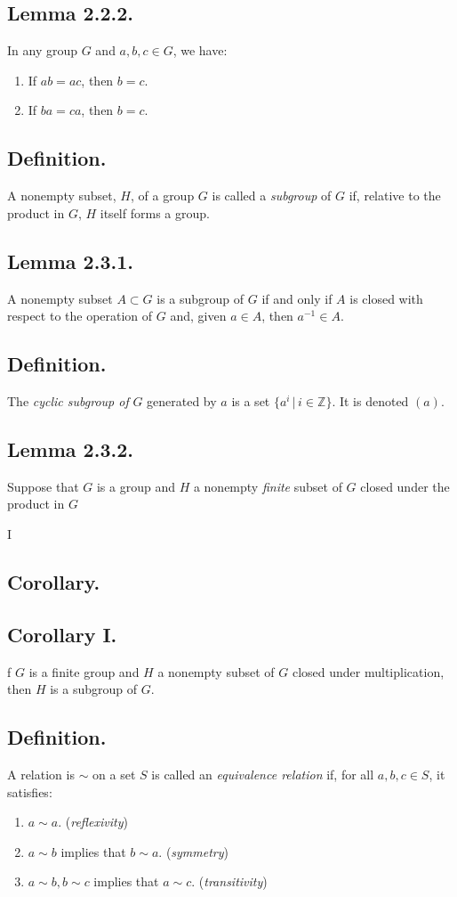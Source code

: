\documentclass{article}
\newenvironment{lemma}[1]{\subsection*{Lemma #1.}}{}
\newenvironment{defn}{\subsection*{Definition.}}{}
\newenvironment{corollary}[1]{
    \def\temp{#1}\ifx\temp\empty
        \subsection*{Corollary.}
    \else
        \subsection*{Corollary #1.}
    \fi
    
}{}
\newcommand*{\Z}{\mathbb{Z}}
\begin{document}
\begin{lemma}{2.2.2}
    In any group $G$ and $a, b, c \in G$, we have:
    \begin{enumerate}[label=(\alph*)]
        \item If $ab = ac$, then $b = c$.
        \item If $ba = ca$, then $b = c$.
    \end{enumerate}
\end{lemma}

\begin{defn}
    A nonempty subset, $H$, of a group $G$ is called a \textit{subgroup} of $G$ if,
    relative to the product in $G$, $H$ itself forms a group.
\end{defn}

\begin{lemma}{2.3.1}
    A nonempty subset $A \subset G$ is a subgroup of $G$ if and only if $A$ is closed 
    with respect to the operation of $G$ and, given $a \in A$, then $a^{-1} \in A$.
\end{lemma}

\begin{defn}
    The \textit{cyclic subgroup of} $G$ generated by $a$ is a set $\{a^i \, | \, i \in \Z\}$.
    It is denoted $(a)$.
\end{defn}

\begin{lemma}{2.3.2}
    Suppose that $G$ is a group and $H$ a nonempty \textit{finite} subset of $G$ closed under the product in $G$
\end{lemma}

\begin{corollary}
    If $G$ is a finite group and $H$ a nonempty subset of $G$ closed under multiplication, then $H$ is a subgroup of $G$.
\end{corollary}

\begin{defn}
    A relation is $\sim$ on a set $S$ is called an \textit{equivalence relation} if,
    for all $a, b, c \in S$, it satisfies:
    \begin{enumerate}[label=(\alph*)]
        \item $a \sim a$. (\textit{reflexivity})
        \item $a \sim b$ implies that $b \sim a$. (\textit{symmetry})
        \item $a \sim b, b \sim c$ implies that $a \sim c$. (\textit{transitivity})
    \end{enumerate}
\end{defn}
\end{document}
